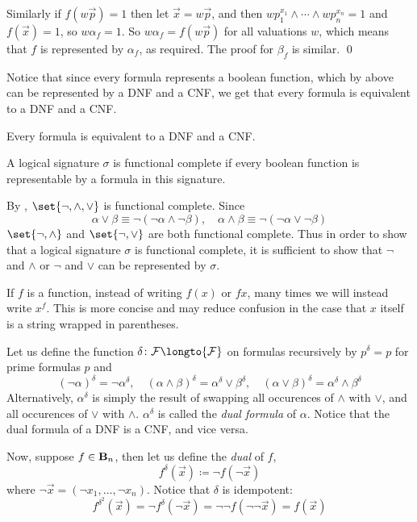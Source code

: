 Similarly if $f(w\vec p)=1$ then let $\vec x=w\vec p$, and then $wp_1^{x_1}\land\cdots\land wp_n^{x_n}=1$ and $f(\vec x)=1$, so $w\alpha_f=1$.
So $w\alpha_f=f(w\vec p)$ for all valuations $w$, which means that $f$ is represented by $\alpha_f$, as required.
The proof for $\beta_f$ is similar.
\qed

Notice that since every formula represents a boolean function, which by above can be represented by a DNF and a CNF, we get that every formula is equivalent to a DNF and a CNF.

\bcoro[name=dnfandcnf]

    Every formula is equivalent to a DNF and a CNF.

\ecoro

\bdefn

    A logical signature $\sigma$ is {\emphcolor functional complete} if every boolean function is representable by a formula in this signature.

\edefn

By , $\set{\neg,\land,\lor}$ is functional complete.
Since
$$ \alpha\lor\beta \equiv \neg(\neg\alpha\land\neg\beta),\quad \alpha\land\beta \equiv \neg(\neg\alpha\lor\neg\beta) $$
$\set{\neg,\land}$ and $\set{\neg,\lor}$ are both functional complete.
Thus in order to show that a logical signature $\sigma$ is functional complete, it is sufficient to show that $\neg$ and $\land$ or $\neg$ and $\lor$ can be represented by $\sigma$.

\bnote

    If $f$ is a function, instead of writing $f(x)$ or $fx$, many times we will instead write $x^f$.
    This is more concise and may reduce confusion in the case that $x$ itself is a string wrapped in parentheses.

\enote

Let us define the function $\delta\colon{\cal F}\longto{\cal F}$ on formulas recursively by $p^\delta=p$ for prime formulas $p$ and
$$ (\neg\alpha)^\delta = \neg\alpha^\delta,\quad (\alpha\land\beta)^\delta = \alpha^\delta\lor\beta^\delta,\quad (\alpha\lor\beta)^\delta=\alpha^\delta\land\beta^\delta $$
Alternatively, $\alpha^\delta$ is simply the result of swapping all occurences of $\land$ with $\lor$, and all occurences of $\lor$ with $\land$.
$\alpha^\delta$ is called the {\it dual formula} of $\alpha$.
Notice that the dual formula of a DNF is a CNF, and vice versa.

Now, suppose $f\in{\bf B}_n$, then let us define the {\it dual} of $f$,
$$ f^\delta(\vec x) \coloneqq \neg f(\neg\vec x) $$
where $\neg\vec x=(\neg x_1,\dots,\neg x_n)$.
Notice that $\delta$ is idempotent:
$$ f^{\delta^2}(\vec x) = \neg f^\delta(\neg\vec x) = \neg\neg f(\neg\neg\vec x) = f(\vec x) $$

